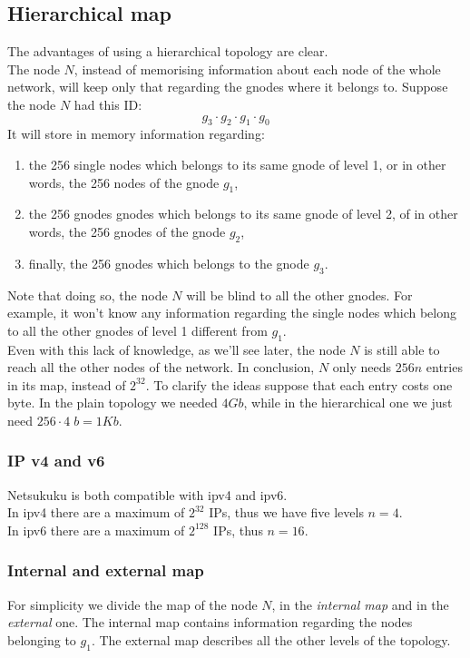 \documentclass[a4paper]{article}
\begin{document}
\subsection{Hierarchical map}
The advantages of using a hierarchical topology are clear.\\
The node $N$, instead of memorising information about each node of the whole
network, will keep only that regarding the gnodes where it belongs to.
Suppose the node $N$ had this ID:
\[
g_3\cdot g_2\cdot g_1\cdot g_0
\]
It will store in memory information regarding:
\begin{enumerate}
	\item the 256 single nodes which belongs to its same gnode of level 1,
		or in other words, the 256 nodes of the gnode $g_1$,
	\item the 256 gnodes gnodes which belongs to its same gnode of level
		2, of in other words, the 256 gnodes of the gnode $g_2$,
	\item finally, the 256 gnodes which belongs to the gnode $g_3$.
\end{enumerate}
Note that doing so, the node $N$ will be blind to all the other gnodes. For
example, it won't know any information regarding the single nodes which belong
to all the other gnodes of level 1 different from $g_1$.\\

Even with this lack of knowledge, as we'll see later, the node $N$ is still
able to reach all the other nodes of the network.
In conclusion, $N$ only needs $256n$ entries in its map, instead of $2^{32}$. 
To clarify the ideas suppose that each entry costs one byte. In the plain
topology we needed $4Gb$, while in the hierarchical one we just need $256\cdot 4\;
b= 1Kb$.

\subsubsection{IP v4 and v6}
Netsukuku is both compatible with ipv4 and ipv6.\\

In ipv4 there are a maximum of $2^{32}$ IPs, thus we have five levels $n=4$.\\
In ipv6 there are a maximum of $2^{128}$ IPs, thus $n=16$.

\subsubsection{Internal and external map}
For simplicity we divide the map of the node $N$, in the \emph{internal map} and in
the \emph{external} one.  The internal map contains information regarding the
nodes belonging to $g_1$. The external map describes all the other levels of
the topology.
\end{document}
